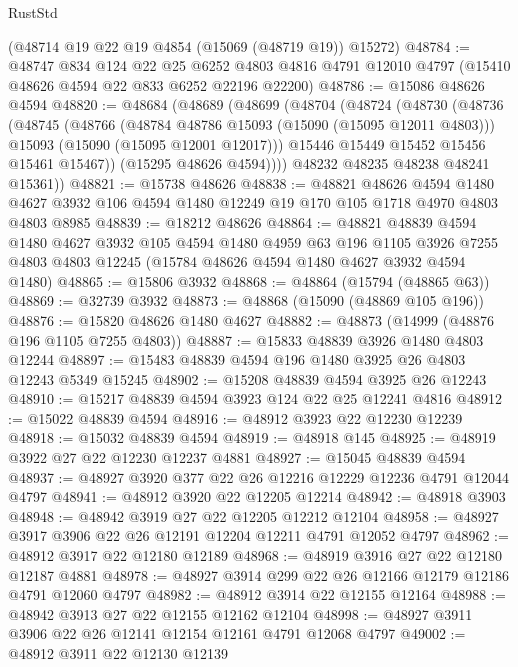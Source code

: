 \begin{lexlean}{RustStd}
\begin{coremodule}
    (@48714 @19 @22 @19 @4854 (@15069 (@48719 @19)) @15272)
@48784 := @48747
    @834
    @124
    @22
    @25
    @6252
    @4803
    @4816
    @4791
    @12010
    @4797
    (@15410 @48626 @4594 @22 @833 @6252 @22196 @22200)
@48786 := @15086 @48626 @4594
@48820 := @48684
    (@48689
      (@48699
        (@48704
          (@48724
            (@48730
              (@48736
                (@48745
                  (@48766
                    (@48784 @48786 @15093 (@15090 (@15095 @12011 @4803)))
                    @15093
                    (@15090 (@15095 @12001 @12017)))
                  @15446
                  @15449
                  @15452
                  @15456
                  @15461
                  @15467))
              (@15295 @48626 @4594))))
        @48232
        @48235
        @48238
        @48241
        @15361))
@48821 := @15738 @48626
@48838 := @48821
    @48626
    @4594
    @1480
    @4627
    @3932
    @106
    @4594
    @1480
    @12249
    @19
    @170
    @105
    @1718
    @4970
    @4803
    @4803
    @8985
@48839 := @18212 @48626
@48864 := @48821
    @48839
    @4594
    @1480
    @4627
    @3932
    @105
    @4594
    @1480
    @4959
    @63
    @196
    @1105
    @3926
    @7255
    @4803
    @4803
    @12245
    (@15784 @48626 @4594 @1480 @4627 @3932 @4594 @1480)
@48865 := @15806 @3932
@48868 := @48864 (@15794 (@48865 @63))
@48869 := @32739 @3932
@48873 := @48868 (@15090 (@48869 @105 @196))
@48876 := @15820 @48626 @1480 @4627
@48882 := @48873 (@14999 (@48876 @196 @1105 @7255 @4803))
@48887 := @15833 @48839 @3926 @1480 @4803 @12244
@48897 := @15483 @48839 @4594 @196 @1480 @3925 @26 @4803 @12243 @5349 @15245
@48902 := @15208 @48839 @4594 @3925 @26 @12243
@48910 := @15217 @48839 @4594 @3923 @124 @22 @25 @12241 @4816
@48912 := @15022 @48839 @4594
@48916 := @48912 @3923 @22 @12230 @12239
@48918 := @15032 @48839 @4594
@48919 := @48918 @145
@48925 := @48919 @3922 @27 @22 @12230 @12237 @4881
@48927 := @15045 @48839 @4594
@48937 := @48927 @3920 @377 @22 @26 @12216 @12229 @12236 @4791 @12044 @4797
@48941 := @48912 @3920 @22 @12205 @12214
@48942 := @48918 @3903
@48948 := @48942 @3919 @27 @22 @12205 @12212 @12104
@48958 := @48927 @3917 @3906 @22 @26 @12191 @12204 @12211 @4791 @12052 @4797
@48962 := @48912 @3917 @22 @12180 @12189
@48968 := @48919 @3916 @27 @22 @12180 @12187 @4881
@48978 := @48927 @3914 @299 @22 @26 @12166 @12179 @12186 @4791 @12060 @4797
@48982 := @48912 @3914 @22 @12155 @12164
@48988 := @48942 @3913 @27 @22 @12155 @12162 @12104
@48998 := @48927 @3911 @3906 @22 @26 @12141 @12154 @12161 @4791 @12068 @4797
@49002 := @48912 @3911 @22 @12130 @12139

\end{coremodule}
\end{lexlean}
